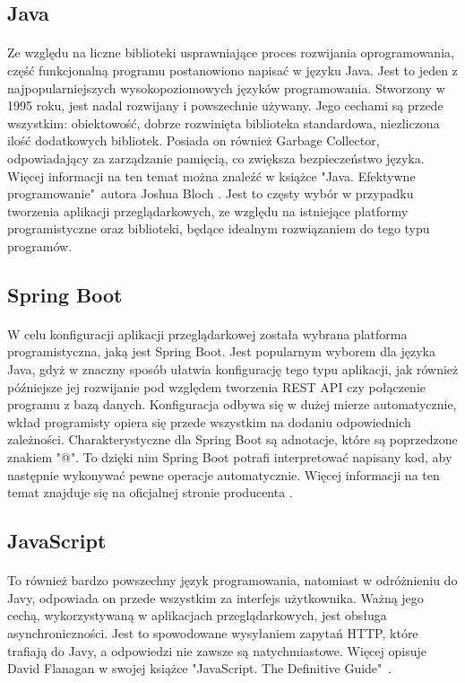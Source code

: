\subsection{Java}
\paragraph{}
Ze względu na liczne biblioteki usprawniające proces rozwijania oprogramowania, część funkcjonalną programu postanowiono napisać w języku Java. Jest to jeden z najpopularniejszych wysokopoziomowych języków programowania. Stworzony w 1995 roku, jest nadal rozwijany i powszechnie używany. Jego cechami są przede wszystkim: obiektowość, dobrze rozwinięta biblioteka standardowa, niezliczona ilość dodatkowych bibliotek. Posiada on również Garbage Collector, odpowiadający za zarządzanie pamięcią, co zwiększa bezpieczeństwo języka. Więcej informacji na ten temat można znaleźć w książce "Java. Efektywne programowanie"\ autora Joshua Bloch \cite{bib:java}. Jest to częsty wybór w przypadku tworzenia aplikacji przeglądarkowych, ze względu na istniejące platformy programistyczne oraz biblioteki, będące idealnym rozwiązaniem do tego typu programów.

\subsection{Spring Boot}
\paragraph{}
W celu konfiguracji aplikacji przeglądarkowej została wybrana platforma programistyczna, jaką jest Spring Boot. Jest popularnym wyborem dla języka Java, gdyż w znaczny sposób ułatwia konfigurację tego typu aplikacji, jak również późniejsze jej rozwijanie pod względem tworzenia REST API czy połączenie programu z bazą danych. Konfiguracja odbywa się w dużej mierze automatycznie, wkład programisty opiera się przede wszystkim na dodaniu odpowiednich zależności. Charakterystyczne dla Spring Boot są adnotacje, które są poprzedzone znakiem "@". To dzięki nim Spring Boot potrafi interpretować napisany kod, aby następnie wykonywać pewne operacje automatycznie. Więcej informacji na ten temat znajduje się na oficjalnej stronie producenta \cite{bib:spring}.

\subsection{JavaScript}
\paragraph{}
To również bardzo powszechny język programowania, natomiast w odróżnieniu do Javy, odpowiada on przede wszystkim za interfejs użytkownika. Ważną jego cechą, wykorzystywaną w aplikacjach przeglądarkowych, jest obsługa asynchroniczności. Jest to spowodowane wysyłaniem zapytań HTTP, które trafiają do Javy, a odpowiedzi nie zawsze są natychmiastowe. Więcej opisuje David Flanagan w swojej książce "JavaScript. The Definitive Guide"\ \cite{bib:javascript}.

